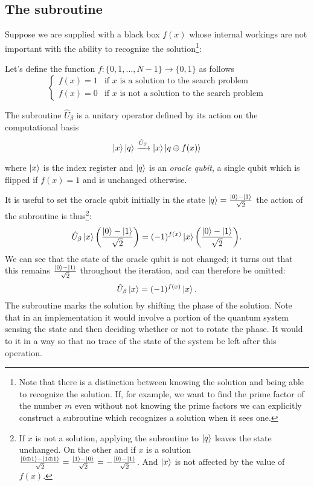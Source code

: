 \subsection{The subroutine}\label{sec:subroutine}
Suppose we are supplied with a black box $f(x)$ whose internal workings are not important with the ability to recognize the solution\footnote{Note that there is a distinction between knowing the solution and being able to recognize the solution. If, for example, we want to find the prime factor of the number $m$ even without not knowing the prime factors we can explicitly construct a subroutine which recognizes a solution when it sees one.}:
\begin{defn}
Let's define the function $f: \{0,1,...,N-1\} \rightarrow \{0,1\}$ as follows
\begin{equation*}
    \begin{cases}
f(x) = 1  & \text{if $x$ is a solution to the search problem} \\
f(x) = 0 & \text{if $x$ is not a solution to the search problem} 
\end{cases}
\end{equation*}
\end{defn}
\begin{defn}
The subroutine $\hat{U}_\beta$ is a unitary operator defined by its action on the computational basis
\begin{equation*}
    \ket{x}\ket{q} \xrightarrow{\hat{U}_\beta} \ket{x} \ket{q \oplus f(x)}
\end{equation*}
\end{defn}
where $\ket{x}$ is the index register and $\ket{q}$ is an \emph{oracle qubit}, a single qubit which is flipped if $f(x) = 1$ and is unchanged otherwise.

It is useful to set the oracle qubit initially in the state $\ket{q} = \frac{\ket{0}-\ket{1}}{\sqrt{2}}$ the action of the subroutine is thus\footnote{If $x$ is not a solution, applying the subroutine to $\ket{q}$ leaves the state unchanged. On the other and if $x$ is a solution $\frac{\ket{0 \oplus 1} - \ket{1 \oplus 1}}{\sqrt{2}} = \frac{\ket{1}-\ket{0}}{\sqrt{2}} = - \frac{\ket{0}-\ket{1}}{\sqrt{2}}$. And $\ket{x}$ is not affected by the value of $f(x)$.}:
\begin{equation*}
    \hat{U}_\beta \ket{x} \biggl(\frac{\ket{0}-\ket{1}}{\sqrt{2}}\biggr) = (-1)^{f(x)} \ket{x} \biggl(\frac{\ket{0}-\ket{1}}{\sqrt{2}}\biggr).
\end{equation*}
We can see that the state of the oracle qubit is not changed; it turns out that this remains  $\frac{\ket{0}-\ket{1}}{\sqrt{2}}$ throughout the iteration, and can therefore be omitted:
\begin{equation*}
    \hat{U}_\beta \ket{x} = (-1)^{f(x)} \ket{x}.
\end{equation*}
The subroutine marks the solution by shifting the phase of the solution. Note that in an implementation it would involve a portion of the quantum system sensing the state and then deciding whether or not to rotate the phase. It would to it in a way so that no trace of the state of the system be left after this operation.
